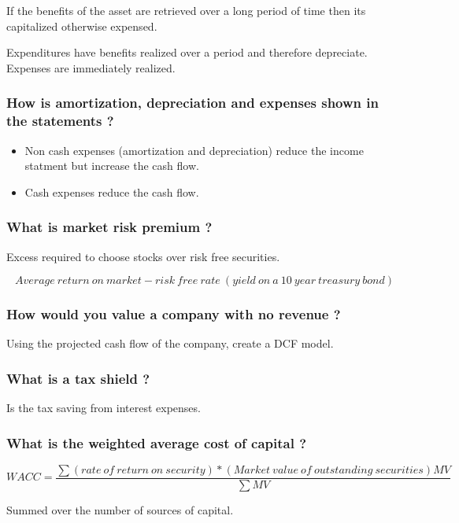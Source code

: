 \documentclass[11pt]{scrartcl} %
\begin{document}
If the benefits of the asset are retrieved over a long period of time then its capitalized otherwise expensed.

Expenditures have benefits realized over a period and therefore depreciate. Expenses are immediately realized.

\subsubsection{How is amortization, depreciation and expenses shown in the statements ?}

\begin{itemize}
	\item Non cash expenses (amortization and depreciation) reduce the income statment but increase the cash flow.
	\item Cash expenses reduce the cash flow.
\end{itemize}

\subsubsection{What is market risk premium ?}

Excess required to choose stocks over risk free securities.

\[ Average\:return\:on\:market - risk\:free\:rate\:(yield\:on\:a\:10\:year\:treasury\:bond) \]

\subsubsection{How would you value a company with no revenue ?}

Using the projected cash flow of the company, create a DCF model. 

\subsubsection{What is a tax shield ?}

Is the tax saving from interest expenses.

\subsubsection{What is the weighted average cost of capital ?}

\[WACC = \frac{\sum (rate\:of\:return\:on\:security) * (Market\:value\:of\:outstanding\:securities)MV}{\sum{MV}}\]

Summed over the number of sources of capital.
\end{document}
